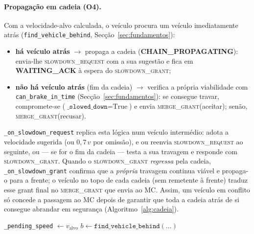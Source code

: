 \documentclass[11pt,a4paper]{article}
\begin{document}
\paragraph{Propagação em cadeia (O4).} Com a velocidade-alvo calculada, o veículo procura
um veículo imediatamente atrás (\texttt{find\_vehicle\_behind}, Secção~\ref{sec:fundamentos}):
\begin{itemize}[noitemsep,topsep=2pt]
  \item \textbf{há veículo atrás} $\rightarrow$ propaga a cadeia
        (\textbf{CHAIN\_PROPAGATING}): envia-lhe \textsc{slowdown\_request} com a sua
        sugestão e fica em \textbf{WAITING\_ACK} à espera do \textsc{slowdown\_grant};
  \item \textbf{não há veículo atrás} (fim da cadeia) $\rightarrow$ verifica a própria
        viabilidade com \texttt{can\_brake\_in\_time} (Secção~\ref{sec:fundamentos}): se
        consegue travar, compromete-se ($\texttt{\_slowed\_down}=\text{True}$) e envia
        \textsc{merge\_grant}(aceitar); senão, \textsc{merge\_grant}(recusar).
\end{itemize}
\texttt{\_on\_slowdown\_request} replica esta lógica num veículo intermédio: adota a
velocidade sugerida (ou $0{,}7\,v$ por omissão), e ou reenvia \textsc{slowdown\_request} ao
seguinte, ou --- se for o fim da cadeia --- testa a sua travagem e responde com
\textsc{slowdown\_grant}. Quando o \textsc{slowdown\_grant} \emph{regressa} pela cadeia,
\texttt{\_on\_slowdown\_grant} confirma que a \emph{própria} travagem continua viável e
propaga-o para a frente; o veículo no topo de cada cadeia (sem remetente à frente) traduz
esse grant final no \textsc{merge\_grant} que envia ao MC. Assim, um veículo em conflito só
concede a passagem ao MC depois de garantir que toda a cadeia atrás de si consegue abrandar
em segurança (Algoritmo~\ref{alg:cadeia}).

\begin{algorithm}[H]
\caption{Propagação em cadeia do abrandamento}
\label{alg:cadeia}
\texttt{\_pending\_speed} $\leftarrow v_{\text{alvo}}$\;
$b \leftarrow \texttt{find\_vehicle\_behind}(\ldots)$\;
\end{algorithm}
\end{document}
